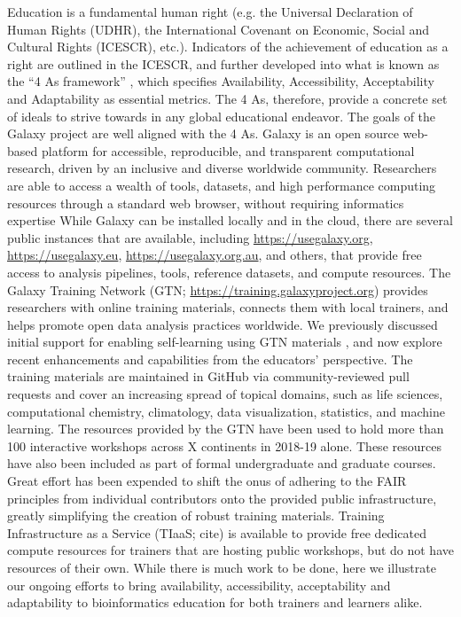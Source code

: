 \documentclass[10pt,letterpaper]{article}
\begin{document}
Education is a fundamental human right (e.g. the Universal Declaration of Human Rights (UDHR), the International Covenant on Economic, Social and Cultural Rights (ICESCR), etc.).
Indicators of the achievement of education as a right are outlined in the ICESCR, and further developed into what is known as the “4 As framework” \cite{tomavsevski2001human}, which specifies Availability, Accessibility, Acceptability and Adaptability as essential metrics.
The 4 As, therefore, provide a concrete set of ideals to strive towards in any global educational endeavor.
The goals of the Galaxy project are well aligned with the 4 As.
Galaxy \cite{Afgan2018} is an open source web-based platform for accessible, reproducible, and transparent computational research, driven by an inclusive and diverse worldwide community.
Researchers are able to access a wealth of tools, datasets, and high performance computing resources through a standard web browser, without requiring informatics expertise
While Galaxy can be installed locally and in the cloud, there are several public instances that are available, including \url{https://usegalaxy.org}, \url{https://usegalaxy.eu}, \url{https://usegalaxy.org.au}, and others, that provide free access to analysis pipelines, tools, reference datasets, and compute resources.
The Galaxy Training Network (GTN; \url{https://training.galaxyproject.org}) provides researchers with online training materials, connects them with local trainers, and helps promote open data analysis practices worldwide. We previously discussed initial support for enabling self-learning using GTN materials \cite{Batut2018}, and now explore recent enhancements and capabilities from the educators’ perspective.
The training materials are maintained in GitHub via community-reviewed pull requests and cover an increasing spread of topical domains, such as life sciences, computational chemistry, climatology, data visualization, statistics, and machine learning.
The resources provided by the GTN have been used to hold more than 100 interactive workshops across X continents in 2018-19 alone.
These resources have also been included as part of formal undergraduate and graduate courses. Great effort has been expended to shift the onus of adhering to the FAIR principles \cite{Wilkinson2016} from individual contributors onto the provided public infrastructure, greatly simplifying the creation of robust training materials.
Training Infrastructure as a Service (TIaaS; cite) is available to provide free dedicated compute resources for trainers that are hosting public workshops, but do not have resources of their own.
While there is much work to be done, here we illustrate our ongoing efforts to bring availability, accessibility, acceptability and adaptability to bioinformatics education for both trainers and learners alike.
\end{document}
